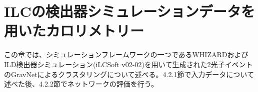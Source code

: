 \section{ILCの検出器シミュレーションデータを用いたカロリメトリー}
この章では、シミュレーションフレームワークの一つであるWHIZARDおよびILD検出器シミュレーション(iLCSoft v02-02)を用いて生成された2光子イベントのGravNetによるクラスタリングについて述べる。4.2.1節で入力データについて述べた後、4.2.2節でネットワークの評価を行う。

